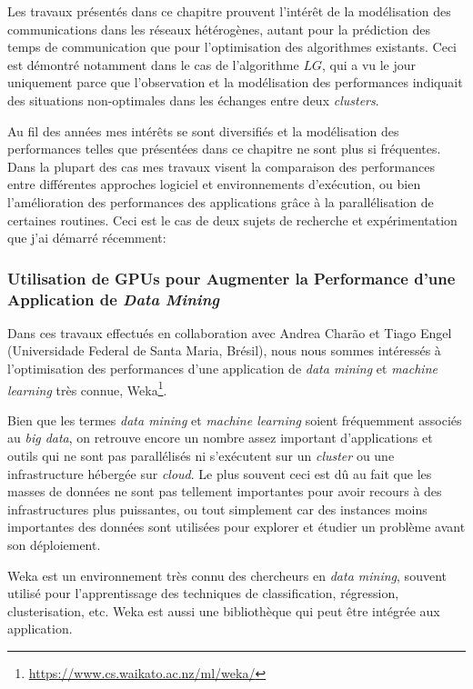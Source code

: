 Les travaux présentés dans ce chapitre prouvent l'intérêt de la modélisation des communications dans les réseaux hétérogènes, autant pour la prédiction des temps de communication que pour l'optimisation des algorithmes existants. Ceci est démontré notamment dans le cas de l'algorithme $LG$, qui a vu le jour uniquement parce que l'observation et la modélisation des performances indiquait des situations non-optimales dans les échanges entre deux \textit{clusters}.

Au fil des années mes intérêts se sont diversifiés et la modélisation des performances telles que présentées dans ce chapitre ne sont plus si fréquentes. Dans la plupart des cas mes travaux visent la comparaison des performances entre différentes approches logiciel et environnements d'exécution, ou bien l'amélioration des performances des applications grâce à la parallélisation de certaines routines. Ceci est le cas de deux sujets de recherche et expérimentation que j'ai démarré récemment:

\subsubsection*{Utilisation de GPUs pour Augmenter la Performance d'une Application de \textit{Data Mining}}

Dans ces travaux effectués en collaboration avec Andrea Charão et Tiago Engel (Universidade Federal de Santa Maria, Brésil), nous nous sommes intéressés à l'optimisation des performances d'une application de \textit{data mining} et \textit{machine learning }très connue, Weka\footnote{\url{https://www.cs.waikato.ac.nz/ml/weka/}}. 

Bien que les termes \textit{data mining} et \textit{machine learning} soient fréquemment associés au \textit{big data}, on retrouve encore un nombre assez important d'applications et outils qui ne sont pas parallélisés ni s'exécutent sur un \textit{cluster} ou une infrastructure hébergée sur \textit{cloud}. Le plus souvent ceci est dû au fait que les masses de données ne sont pas tellement importantes pour avoir recours à des infrastructures plus puissantes, ou tout simplement car des instances moins importantes des données sont utilisées pour explorer et étudier un problème avant son déploiement.

Weka est un environnement très connu des chercheurs en \textit{data mining}, souvent utilisé pour l'apprentissage des techniques de classification, régression, clusterisation, etc. Weka est aussi une bibliothèque qui peut être intégrée aux application.  

